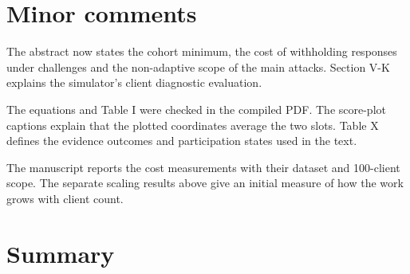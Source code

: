 \documentclass[11pt,a4paper]{article}
\begin{document}
\section*{Minor comments}

The abstract now states the cohort minimum, the cost of withholding
responses under challenges and the non-adaptive scope of the main
attacks. Section V-K explains the simulator's client diagnostic
evaluation.

The equations and Table I were checked in the compiled PDF. The
score-plot captions explain that the plotted coordinates average the
two slots. Table X defines the evidence outcomes and participation
states used in the text.

The manuscript reports the cost measurements with their dataset and
100-client scope. The separate scaling results above give an initial
measure of how the work grows with client count.


\section*{Summary}
\end{document}
